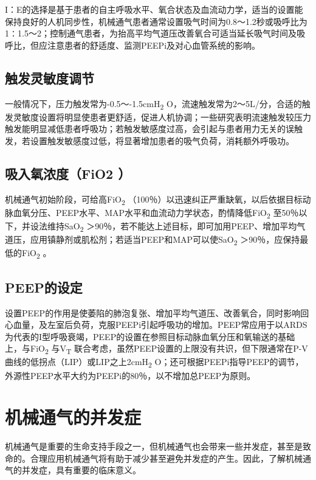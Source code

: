 I：E的选择是基于患者的自主呼吸水平、氧合状态及血流动力学，适当的设置能保持良好的人机同步性，机械通气患者通常设置吸气时间为0.8～1.2秒或吸呼比为1∶1.5～2；控制通气患者，为抬高平均气道压改善氧合可适当延长吸气时间及吸呼比，但应注意患者的舒适度、监测PEEPi及对心血管系统的影响。

\subsection{触发灵敏度调节}

一般情况下，压力触发常为-0.5～-1.5cmH\textsubscript{2}
O，流速触发常为2～5L/分，合适的触发灵敏度设置将明显使患者更舒适，促进人机协调；一些研究表明流速触发较压力触发能明显减低患者呼吸功；若触发敏感度过高，会引起与患者用力无关的误触发，若设置触发敏感度过低，将显著增加患者的吸气负荷，消耗额外呼吸功。

\subsection{吸入氧浓度（FiO2 ）}

机械通气初始阶段，可给高FiO\textsubscript{2}
（100％）以迅速纠正严重缺氧，以后依据目标动脉血氧分压、PEEP水平、MAP水平和血流动力学状态，酌情降低FiO\textsubscript{2}
至50％以下，并设法维持SaO\textsubscript{2}
＞90％，若不能达上述目标，即可加用PEEP、增加平均气道压，应用镇静剂或肌松剂；若适当PEEP和MAP可以使SaO\textsubscript{2}
＞90％，应保持最低的FiO\textsubscript{2} 。

\subsection{PEEP的设定}

设置PEEP的作用是使萎陷的肺泡复张、增加平均气道压、改善氧合，同时影响回心血量，及左室后负荷，克服PEEPi引起呼吸功的增加。PEEP常应用于以ARDS为代表的I型呼吸衰竭，PEEP的设置在参照目标动脉血氧分压和氧输送的基础上，与FiO\textsubscript{2}
与V\textsubscript{T}
联合考虑，虽然PEEP设置的上限没有共识，但下限通常在P-V曲线的低拐点（LIP）或LIP之上2cmH\textsubscript{2}
O；还可根据PEEPi指导PEEP的调节，外源性PEEP水平大约为PEEPi的80％，以不增加总PEEP为原则。

\section{机械通气的并发症}

机械通气是重要的生命支持手段之一，但机械通气也会带来一些并发症，甚至是致命的。合理应用机械通气将有助于减少甚至避免并发症的产生。因此，了解机械通气的并发症，具有重要的临床意义。

